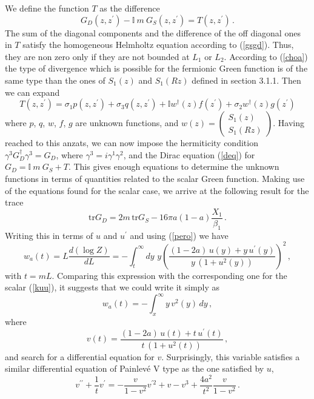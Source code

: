 \documentclass[a4paper]{article}
\begin{document}
 We define the function $T$ as the difference
\begin{equation}
G_D(z,z^{\prime})-\mathbb I ~m~G_S(z,z^{\prime})=T(z,z^{\prime})\,.
\end{equation}
The sum of the diagonal components and the difference of the off diagonal ones in $T$ satisfy the homogeneous Helmholtz equation according to (\ref{gsgd}). Thus, they are non zero only if they are not bounded at $L_1$ or $L_2$. According to (\ref{choa}) the type of divergence which is possible for the fermionic Green function is of the same type than the ones of $S_1(z)$ and $S_1(Rz)$ defined in section 3.1.1. Then we can expand 
\begin{equation}
T(z,z^{\prime})=\sigma_1 p(z,z^{\prime})+\sigma_3 q(z,z^{\prime})+\mathbb I w^{\dagger}(z)f(z^{\prime})+\sigma_2 w^{\dagger}(z)g(z^{\prime}) 
\end{equation}
where $p$, $q$, $w$, $f$, $g$ are unknown functions, and $w(z)=\begin{pmatrix}S_1(z)\\S_1(Rz)\end{pmatrix}$.
Having reached to this anzats, we can now impose the hermiticity condition $\gamma^3 G_D^\dagger \gamma^3=G_D$, where $\gamma^3=i \gamma^1 \gamma^2$, and the Dirac equation (\ref{deq}) for $G_D=\mathbb I ~m~G_S+T$. This gives enough equations to determine the unknown functions in terms of quantities related to the scalar Green function. Making use of the equations found for the scalar case, we arrive at the following result for the trace 
\begin{equation}
\textrm{tr}G_D=2 m\, \textrm{tr}G_S -16 \pi a (1-a)\frac{X_1}{\beta_1}\,.
\end{equation} 
Writing this in terms of $u$ and $u^\prime$ and using  (\ref{pero}) we have
\begin{equation}
w_a(t)=L \frac{d(\log Z)}{dL}=-\int_t^\infty dy \,\,y \left( \frac{(1-2a)\,u(y) +y\,u^{\prime}(y)}{y\,(1+u^2(y))}\right)^2\,,\label{pejot}
\end{equation} 
with $t=m L$. Comparing this expression with the corresponding one for the scalar (\ref{kuu}), it suggests that we could write it simply as
\begin{equation}
w_{a }(t)=-\int_{x}^{\infty }y\,v^{2}(y)\,dy \,,  \label{uni}
\end{equation} 
where
\begin{equation}
v(t)=\frac{(1-2a)\,u(t) +t\,u^{\prime}(t)}{t\,(1+u^2(t))}\,,\label{tiro}
\end{equation}
and search for a differential equation for $v$. Surprisingly, this variable satisfies a similar differential equation of Painlev\'e V type as the one satisfied by $u$,   
\begin{equation}
v^{\prime \prime }+\frac{1}{t}v^{\prime }=-\frac{
v}{1-v^{2}} v^{\prime 2}+v-v^{3}+\frac{4 a^{2}}{t^{2}}\frac{v}{1-v^{2}}\,.  \label{q}
\end{equation}
\end{document}
